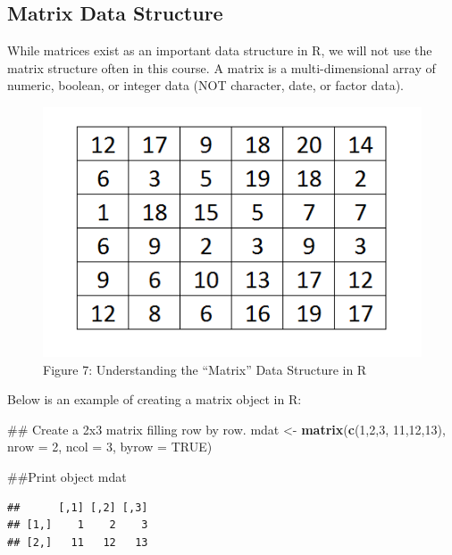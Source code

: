 \documentclass[]{book}
\newenvironment{Shaded}{\begin{snugshade}}{\end{snugshade}}
\newcommand{\KeywordTok}[1]{\textcolor[rgb]{0.13,0.29,0.53}{\textbf{{#1}}}}
\newcommand{\DataTypeTok}[1]{\textcolor[rgb]{0.13,0.29,0.53}{{#1}}}
\newcommand{\DecValTok}[1]{\textcolor[rgb]{0.00,0.00,0.81}{{#1}}}
\newcommand{\StringTok}[1]{\textcolor[rgb]{0.31,0.60,0.02}{{#1}}}
\newcommand{\OtherTok}[1]{\textcolor[rgb]{0.56,0.35,0.01}{{#1}}}
\newcommand{\NormalTok}[1]{{#1}}
\begin{document}
\subsection{Matrix Data Structure}\label{matrix-data-structure}

While matrices exist as an important data structure in R, we will not
use the matrix structure often in this course. A matrix is a
multi-dimensional array of numeric, boolean, or integer data (NOT
character, date, or factor data).

\begin{figure}[htbp]
\centering
\includegraphics{matrix.PNG}
\caption{Figure 7: Understanding the ``Matrix'' Data Structure in R}
\end{figure}

Below is an example of creating a matrix object in R:

\begin{Shaded}
\begin{Highlighting}[]
\NormalTok{## Create a 2x3 matrix filling row by row.}
\NormalTok{mdat <-}\StringTok{ }\KeywordTok{matrix}\NormalTok{(}\KeywordTok{c}\NormalTok{(}\DecValTok{1}\NormalTok{,}\DecValTok{2}\NormalTok{,}\DecValTok{3}\NormalTok{, }\DecValTok{11}\NormalTok{,}\DecValTok{12}\NormalTok{,}\DecValTok{13}\NormalTok{), }\DataTypeTok{nrow =} \DecValTok{2}\NormalTok{, }\DataTypeTok{ncol =} \DecValTok{3}\NormalTok{, }\DataTypeTok{byrow =} \OtherTok{TRUE}\NormalTok{)}

\NormalTok{##Print object}
\NormalTok{mdat}
\end{Highlighting}
\end{Shaded}

\begin{verbatim}
##      [,1] [,2] [,3]
## [1,]    1    2    3
## [2,]   11   12   13
\end{verbatim}
\end{document}
